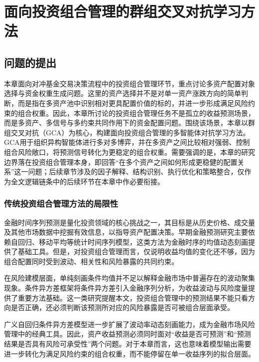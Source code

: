 \chapter{面向投资组合管理的群组交叉对抗学习方法}

\section{问题的提出}

本章面向对冲基金交易决策流程中的投资组合管理环节，重点讨论多资产配置对象选择与资金权重生成问题。这里的资产选择并不是对单一资产涨跌方向的简单判断，而是指在多资产池中识别相对更具配置价值的标的，并进一步形成满足风险约束的组合权重。因此，本章所讨论的投资组合管理任务不是孤立的收益预测场景，而是多资产、多信号与多约束共同作用下的资金配置问题。围绕该场景，本章以群组交叉对抗（GCA）为核心，构建面向投资组合管理的多智能体对抗学习方法。GCA用于组织异构智能体进行多对多博弈，并在多资产之间比较相对强弱、控制组合风险敞口，将预测信号转化为更稳定的组合权重。需要强调的是，本章的研究边界落在投资组合管理本身，即回答“在多个资产之间如何形成更稳健的配置关系”这一问题；后续章节涉及的因子解释、结构识别、执行优化和策略整合，仅作为全文逻辑链条中的后续环节在本章中作必要衔接。

\subsection{传统投资组合管理方法的局限性}
金融时间序列预测是量化投资领域的核心挑战之一，其目标是从历史价格、成交量及其他市场数据中挖掘有效信息，以指导资产配置决策。早期金融预测研究主要依赖自回归、移动平均等统计时间序列模型，这类方法为金融时序的均值动态刻画提供了基础工具\cite{box2015time}。但是，对投资组合管理而言，仅说明收益均值的变化还不够，因为组合配置同时受到波动、相关性和风险暴露的共同约束。

在风险建模层面，单纯刻画条件均值并不足以解释金融市场中普遍存在的波动聚集现象。条件异方差框架将条件异方差引入金融序列分析，为收益波动与风险度量提供了重要方法基础\cite{engle2001garch}。这一类研究提醒本文，投资组合管理中的预测结果不能只看方向是否正确，还必须判断该预测所对应的风险暴露是否可被组合层面承受。

广义自回归条件异方差模型进一步扩展了波动率动态刻画能力，成为金融市场风险管理中的经典工具\cite{bollerslev1986generalized}。因此，资产收益预测必须同时面对“收益是否可预测”和“预测结果是否具有风险可承受性”两个问题。对于本章而言，这也意味着模型输出需要进一步转化为满足风险约束的组合权重，而不能停留在单一收益序列的拟合层面。

